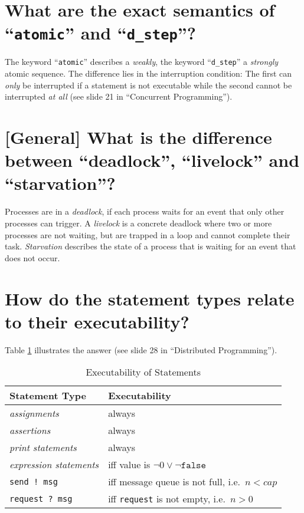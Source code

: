 \section{\capitals{[Promela]} What are the exact semantics of ``\texttt{atomic}'' and ``\texttt{d\_step}''?}
The keyword ``\texttt{atomic}'' describes a \emph{weakly}, the keyword ``\texttt{d\_step}'' a \emph{strongly} atomic sequence. The difference lies in the interruption condition: The first can \emph{only} be interrupted if a statement is not executable while the second cannot be interrupted \emph{at all} (see slide 21 in ``Concurrent Programming'').

\section{[General] What is the difference between ``deadlock'', ``livelock'' and ``starvation''?}
Processes are in a \emph{deadlock}, if each process waits for an event that only other processes can trigger. A \emph{livelock} is a concrete deadlock where two or more processes are not waiting, but are trapped in a loop and cannot complete their task. \emph{Starvation} describes the state of a process that is waiting for an event that does not occur.

\section{\capitals{[Promela]} How do the statement types relate to their executability?}
Table \ref{T:Exec} illustrates the answer (see slide 28 in ``Distributed Programming'').
\begin{table}[h]
\centering
\caption{Executability of Statements}
\label{T:Exec}

\begin{tabular}{|l|l|}
\hline
\textbf{Statement Type} & \textbf{Executability} \\
\hline
\emph{assignments} & always \\
\emph{assertions} & always \\
\emph{print statements} & always \\
\emph{expression statements} & iff value is $\lnot 0 \lor \lnot \texttt{false}$ \\
\texttt{send !\ msg} & iff message queue is not full, i.e.\ $n < cap$ \\
\texttt{request ?\ msg} & iff \texttt{request} is not empty, i.e.\ $n > 0$\\
\hline
\end{tabular}
\end{table}

